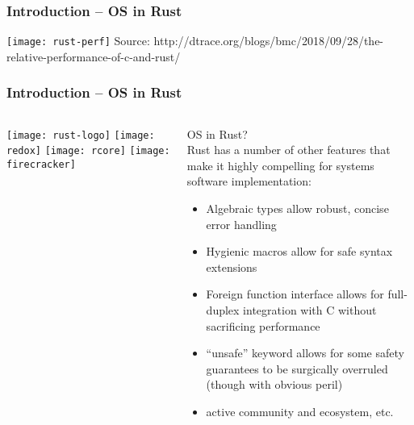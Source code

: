 \begin{frame}[plain]	
	\frametitle{Introduction -- OS in Rust}
	\centering
	\texttt{[image: rust-perf]}
	 \tiny Source: http://dtrace.org/blogs/bmc/2018/09/28/the-relative-performance-of-c-and-rust/
	 
\end{frame}



\begin{frame}[plain]
	\frametitle{Introduction -- OS in Rust}
	
	
	
	\begin{columns}
		
		\begin{column}{.2\textwidth}
			
			\texttt{[image: rust-logo]}
			\texttt{[image: redox]}
			\texttt{[image: rcore]}
			\texttt{[image: firecracker]}
		\end{column}
		
		\begin{column}{.8\textwidth}
			
			OS in Rust? \\
			Rust has a number of other features that make it highly
			compelling for systems software implementation:
			
			\begin{itemize}
				
				\item Algebraic types allow robust, concise error handling
				\item Hygienic macros allow for safe syntax extensions	
				\item Foreign function interface allows for full-duplex integration
				with C without sacrificing performance		
				\item  “unsafe” keyword allows for some safety guarantees to be
				surgically overruled (though with obvious peril)
				\item active community and ecosystem, etc.
				
				
				
			\end{itemize}
			
		\end{column}
		
		
	\end{columns}
	
	
\end{frame}


